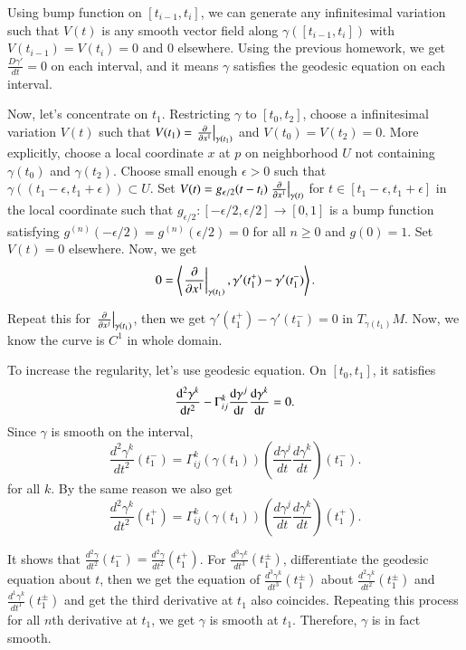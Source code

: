 \documentclass[a4paper, 12pt]{article}
\theoremstyle{Mydefinition}
\theoremstyle{Mytheorem}
\begin{document}
Using bump function on $[t_{i-1}, t_i]$, we can generate any infinitesimal variation such that $V(t)$ is any smooth vector field along $\gamma([t_{i-1}, t_i])$ with $V(t_{i-1})=V(t_i) = 0$ and $0$ elsewhere. Using the previous homework, we get $\frac{D\gamma'}{dt} = 0$ on each interval, and it means $\gamma$ satisfies the geodesic equation on each interval.

Now, let's concentrate on $t_1$. Restricting $\gamma$ to $[t_0, t_2]$, choose a infinitesimal variation $V(t)$ such that $V(t_1) = \left.\pdv{x^1}\right|_{\gamma(t_1)}$ and $V(t_0)=V(t_2) = 0$. More explicitly, choose a local coordinate $x$ at $p$ on neighborhood $U$ not containing $\gamma(t_0)$ and $\gamma(t_2)$. Choose small enough $\epsilon>0$ such that $\gamma((t_1-\epsilon, t_1+\epsilon))\subset U$. Set $V(t) = g_{\epsilon/2}(t-t_i)\left.\pdv{x^1}\right|_{\gamma(t)}$ for $t\in [t_1-\epsilon, t_1+\epsilon]$ in the local coordinate such that $g_{\epsilon/2}:[-\epsilon/2, \epsilon/2]\rightarrow [0,1]$ is a bump function satisfying $g^{(n)}(-\epsilon/2) = g^{(n)}(\epsilon/2) = 0$ for all $n\geq 0$ and $g(0) = 1$. Set $V(t) = 0$ elsewhere. Now, we get
\begin{equation}
    0 = \left\langle \left.\pdv{x^1}\right|_{\gamma(t_1)}, \gamma'(t_1^+)-\gamma'(t_1^-)\right\rangle.
\end{equation}

Repeat this for $\left.\pdv{x^j}\right|_{\gamma(t_1)}$, then we get $\gamma'(t_1^+)-\gamma'(t_1^-) = 0$ in $T_{\gamma(t_1)}M$. Now, we know the curve is $C^1$ in whole domain.

To increase the regularity, let's use geodesic equation. On $[t_0, t_1]$, it satisfies
\begin{equation}
    \dv[2]{\gamma^k}{t} - \Gamma_{ij}^k \dv{\gamma^j}{t}\dv{\gamma^k}{t} = 0.
\end{equation}
Since $\gamma$ is smooth on the interval,
\begin{equation}
    \frac{d^2\gamma^k}{dt^2}(t_1^-) = \Gamma_{ij}^k(\gamma(t_1)) \left(\frac{d\gamma^j}{dt}\frac{d\gamma^k}{dt}\right)(t_1^-).
\end{equation}
for all $k$. By the same reason we also get
\begin{equation}
    \frac{d^2\gamma^k}{dt^2}(t_1^+) = \Gamma_{ij}^k(\gamma(t_1)) \left(\frac{d\gamma^j}{dt}\frac{d\gamma^k}{dt}\right)(t_1^+).
\end{equation}

It shows that $\frac{d^2\gamma}{dt^2}(t_1^-) = \frac{d^2\gamma}{dt^2}(t_1^+)$. For $\frac{d^3\gamma^k}{dt^3}(t_1^\pm)$, differentiate the geodesic equation about $t$, then we get the equation of $\frac{d^3\gamma^k}{dt^3}(t_1^\pm)$ about $\frac{d^2\gamma^k}{dt^2}(t_1^\pm)$ and $\frac{d^1\gamma^k}{dt^1}(t_1^\pm)$ and get the third derivative at $t_1$ also coincides. Repeating this process for all $n$th derivative at $t_1$, we get $\gamma$ is smooth at $t_1$. Therefore, $\gamma$ is in fact smooth.\\
\end{document}
